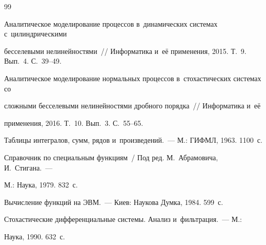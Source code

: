 {\small\frenchspacing

{%


\begin{thebibliography}{99}





Аналитическое моделирование процессов в~динамических системах с~цилиндрическими 

бесселевыми нелинейностями~/\!\!/ Информатика и~её применения, 2015. Т.~9. Вып.~4. С.~39--49.





Аналитическое моделирование нормальных процессов в~стохастических системах со 

сложными бесселевыми нелинейностями дробного порядка~/\!\!/ Информатика и~её 

применения, 2016. Т.~10. Вып.~3. С.~55--65.





Таблицы интегралов, сумм, рядов и~произведений.~--- М.: ГИФМЛ, 1963. 1100~с.




Справочник по специальным функциям~/ Под ред. М.~Абрамовича, И.~Стигана.~--- 

М.: Наука, 1979. 832~с.





Вычисление функций на ЭВМ.~--- Киев: Наукова Думка, 1984. 599~с.





Стохастические дифференциальные системы. Анализ и~фильтрация.~--- М.:

Наука,  1990.  632~с. 








\end{thebibliography}}}
